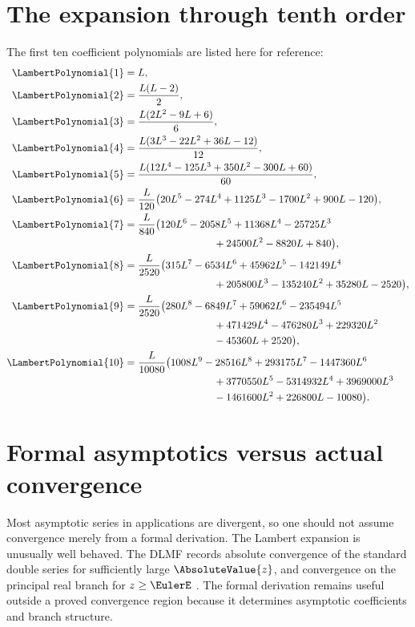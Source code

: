 \documentclass[11pt,openany]{book}
\theoremstyle{definition}
\theoremstyle{plain}
\theoremstyle{remark}
\begin{document}
\section{The expansion through tenth order}
The first ten coefficient polynomials are listed here for reference:
\begin{align*}
\LambertPolynomial{1}={}&L,\\
\LambertPolynomial{2}={}&\frac{L(L-2)}2,\\
\LambertPolynomial{3}={}&\frac{L(2L^2-9L+6)}6,\\
\LambertPolynomial{4}={}&\frac{L(3L^3-22L^2+36L-12)}{12},\\
\LambertPolynomial{5}={}&\frac{L(12L^4-125L^3+350L^2-300L+60)}{60},\\
\LambertPolynomial{6}={}&\frac{L}{120}\bigl(20L^5-274L^4+1125L^3
          -1700L^2+900L-120\bigr),\\
\LambertPolynomial{7}={}&\frac{L}{840}\bigl(120L^6-2058L^5+11368L^4-25725L^3\\[-0.2ex]
&\hspace{7.4em}{}+24500L^2-8820L+840\bigr),\\
\LambertPolynomial{8}={}&\frac{L}{2520}\bigl(315L^7-6534L^6+45962L^5-142149L^4\\[-0.2ex]
&\hspace{7.4em}{}+205800L^3-135240L^2+35280L-2520\bigr),\\
\LambertPolynomial{9}={}&\frac{L}{2520}\bigl(280L^8-6849L^7+59062L^6-235494L^5\\[-0.2ex]
&\hspace{7.4em}{}+471429L^4-476280L^3+229320L^2\\[-0.2ex]
&\hspace{7.4em}{}-45360L+2520\bigr),\\
\LambertPolynomial{10}={}&\frac{L}{10080}\bigl(1008L^9-28516L^8+293175L^7
 -1447360L^6\\[-0.2ex]
&\hspace{7.4em}{}+3770550L^5-5314932L^4+3969000L^3\\[-0.2ex]
&\hspace{7.4em}{}-1461600L^2+226800L-10080\bigr).
\end{align*}

\section{Formal asymptotics versus actual convergence}
Most asymptotic series in applications are divergent, so one should not assume
convergence merely from a formal derivation.  The Lambert expansion is unusually
well behaved.  The DLMF records absolute convergence of the standard double
series for sufficiently large \(\AbsoluteValue{z}\), and convergence on the principal real
branch for \(z\ge\EulerE\) \cite{dlmf-lambert}.  The formal derivation remains useful
outside a proved convergence region because it determines asymptotic
coefficients and branch structure.
\end{document}
